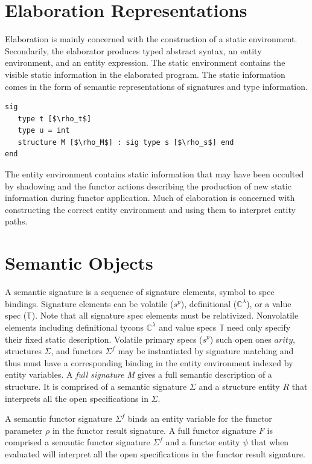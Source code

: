 \section{Elaboration Representations}
Elaboration is mainly concerned with the construction of a static environment. Secondarily, the elaborator produces typed abstract syntax, an entity environment, and an entity expression. The static environment contains the visible static information in the elaborated program. The static information comes in the form of semantic representations of signatures and type information. 

\begin{lstlisting}
sig
   type t [$\rho_t$] 
   type u = int 
   structure M [$\rho_M$] : sig type s [$\rho_s$] end
end
\end{lstlisting}
 
The entity environment contains static information that may have been occulted by shadowing and the functor actions describing the production of new static information during functor application. Much of elaboration is concerned with constructing the correct entity environment and using them to interpret entity paths. 

\section{Semantic Objects}

A semantic signature is a sequence of signature elements, symbol to spec bindings. Signature elements can be volatile ($s^p$), definitional ($\mathbb{C}^\lambda$), or a value spec ($\mathbb{T}$). Note that all signature spec elements must be relativized. Nonvolatile elements including definitional tycons $\mathbb{C}^\lambda$ and value specs $\mathbb{T}$ need only specify their fixed static description. Volatile primary specs ($s^p$) such open ones $arity$, structures $\Sigma$, and functors $\Sigma^f$ may be instantiated by signature matching and thus must have a corresponding binding in the entity environment indexed by entity variables. A \emph{full signature M} gives a full semantic description of a structure. It is comprised of a semantic signature $\Sigma$ and a structure entity $R$ that interprets all the open specifications in $\Sigma$. 

A semantic functor signature $\Sigma^f$ binds an entity variable for the functor parameter $\rho$ in the functor result signature. A full functor signature $F$ is comprised a semantic functor signature $\Sigma^f$ and a functor entity $\psi$ that when evaluated will interpret all the open specifications in the functor result signature. 

